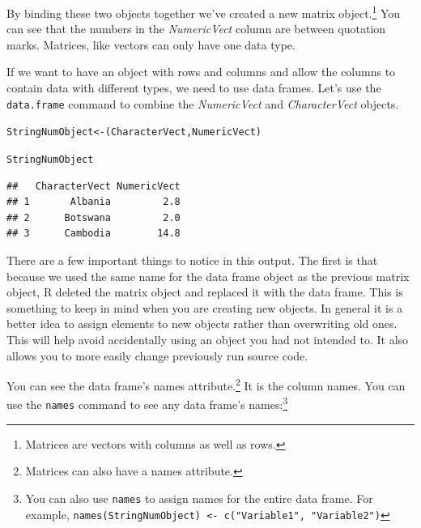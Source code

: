 \noindent By binding these two objects together we've created a new matrix object.\footnote{Matrices are vectors with columns as well as rows.} You can see that the numbers in the {\emph{NumericVect}} column are between quotation marks. Matrices, like vectors can only have one data type. \\[0.25cm]


If we want to have an object with rows and columns and allow the columns to contain data with different types, we need to use data frames. Let's use the \texttt{data.frame} command to combine the {\emph{NumericVect}} and {\emph{CharacterVect}} objects.\label{data.frame}

\begin{knitrout}
\color{fgcolor}\begin{kframe}
\begin{alltt}
StringNumObject <- (CharacterVect, NumericVect)

StringNumObject
\end{alltt}
\begin{verbatim}
##   CharacterVect NumericVect
## 1       Albania         2.8
## 2      Botswana         2.0
## 3      Cambodia        14.8
\end{verbatim}
\end{kframe}
\end{knitrout}


\noindent There are a few important things to notice in this output. The first is that because we used the same name for the data frame object as the previous matrix object, R deleted the matrix object and replaced it with the data frame. This is something to keep in mind when you are creating new objects. In general it is a better idea to assign elements to new objects rather than overwriting old ones. This will help avoid accidentally using an object you had not intended to. It also allows you to more easily change previously run source code.

You can see the data frame's names attribute.\footnote{Matrices can also have a names attribute.} It is the column names. You can use the \texttt{names} command to see any data frame's names:\footnote{You can also use \texttt{names} to assign names for the entire data frame. For example, \texttt{names(StringNumObject) <- c("Variable1", "Variable2")}}


